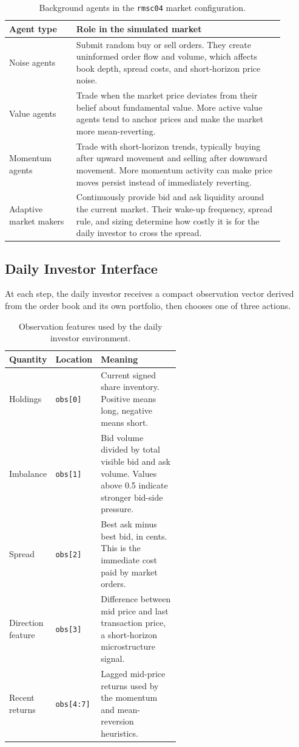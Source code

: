 \documentclass[11pt]{article}
\begin{document}
\begin{table}[H]
\centering
\small
\begin{tabular}{p{0.22\linewidth}p{0.68\linewidth}}
\toprule
Agent type & Role in the simulated market \\
\midrule
Noise agents &
Submit random buy or sell orders. They create uninformed order flow and volume,
which affects book depth, spread costs, and short-horizon price noise. \\
Value agents &
Trade when the market price deviates from their belief about fundamental value.
More active value agents tend to anchor prices and make the market more
mean-reverting. \\
Momentum agents &
Trade with short-horizon trends, typically buying after upward movement and
selling after downward movement. More momentum activity can make price moves
persist instead of immediately reverting. \\
Adaptive market makers &
Continuously provide bid and ask liquidity around the current market. Their
wake-up frequency, spread rule, and sizing determine how costly it is for the
daily investor to cross the spread. \\
\bottomrule
\end{tabular}
\caption{Background agents in the \texttt{rmsc04} market configuration.}
\label{tab:background-agents}
\end{table}

\subsection{Daily Investor Interface}

At each step, the daily investor receives a compact observation vector derived
from the order book and its own portfolio, then chooses one of three actions.

\begin{table}[H]
\centering
\small
\begin{tabular}{llp{0.56\linewidth}}
\toprule
Quantity & Location & Meaning \\
\midrule
Holdings & \texttt{obs[0]} & Current signed share inventory. Positive means long,
negative means short. \\
Imbalance & \texttt{obs[1]} & Bid volume divided by total visible bid and ask volume.
Values above 0.5 indicate stronger bid-side pressure. \\
Spread & \texttt{obs[2]} & Best ask minus best bid, in cents. This is the immediate
cost paid by market orders. \\
Direction feature & \texttt{obs[3]} & Difference between mid price and last
transaction price, a short-horizon microstructure signal. \\
Recent returns & \texttt{obs[4:7]} & Lagged mid-price returns used by the
momentum and mean-reversion heuristics. \\
\bottomrule
\end{tabular}
\caption{Observation features used by the daily investor environment.}
\label{tab:observation-context}
\end{table}
\end{document}
